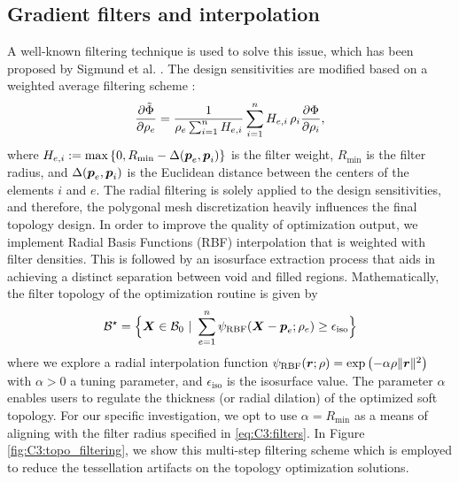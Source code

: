\subsection{Gradient filters and interpolation}
A well-known filtering technique is used to solve this issue, which has been proposed by Sigmund et al. \cite{Bendsoe2003}. The design sensitivities are modified based on a weighted average filtering scheme \cite{Gain2013Dec,Bendsoe2003}:
%
\begin{equation}
\frac{\partial \tilde{\Phi}}{\partial {\rho_e}} = \frac{1}{\rho_e \sum^n_{i=1} H_{e,i}} \sum^n_{i=1} H_{e,i} \,\rho_i \frac{\partial {\Phi}}{\partial {\rho_i}},
\label{eq:C3:filters}
\end{equation}
%
where $H_{e,i} := \textrm{max} \left\{0, R_{\textrm{min}} - \Delta({\boldsymbol{p}}_e,{\boldsymbol{p}}_i)\right\}$ is the filter weight, $R_{\textrm{min}}$ is the filter radius, and $\Delta({\boldsymbol{p}}_e,{\boldsymbol{p}}_i)$ is the Euclidean distance between the centers of the elements $i$ and $e$. The radial filtering is solely applied to the design sensitivities, and therefore, the polygonal mesh discretization heavily influences the final topology design. In order to improve the quality of optimization output, we implement Radial Basis Functions (RBF) interpolation that is weighted with filter densities. This is followed by an isosurface extraction process that aids in achieving a distinct separation between void and filled regions. Mathematically, the filter topology of the optimization routine is given by 
%
\begin{equation}
\mathcal{B}^\star = \Big\{ {\boldsymbol{X}} \in \mathcal{B}_0 ~
|~ \sum_{e=1}^{n} \psi_{\textrm{RBF}}({\boldsymbol{X}} - {\boldsymbol{p}}_e; \rho_e) \ge \epsilon_\textrm{iso}\Big\}
\end{equation}
%
where we explore a radial interpolation function $\psi_{\textrm{RBF}}({\boldsymbol{r}}; \rho) = \exp\left( - \alpha \rho \lVert{\boldsymbol{r}}\rVert^2 \right)$ with $\alpha > 0$ a tuning parameter, and $\epsilon_{\textrm{iso}}$ is the isosurface value. The parameter $\alpha$ enables users to regulate the thickness (or radial dilation) of the optimized soft topology. For our specific investigation, we opt to use $\alpha = R_\textrm{min}$ as a means of aligning with the filter radius specified in \eqref{eq:C3:filters}. In Figure \ref{fig:C3:topo_filtering}, we show this multi-step filtering scheme which is employed to reduce the tessellation artifacts on the topology optimization solutions.

